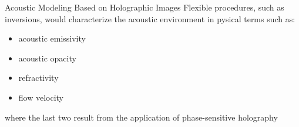 \documentclass{beamer}
\begin{document}

\begin{frame}{Acoustic Modeling Based on Holographic Images}
    Flexible procedures, such as inversions, would characterize the
    acoustic environment in pysical terms such as:
    \begin{itemize}
        \item acoustic emissivity
        \item acoustic opacity
        \item refractivity
        \item flow velocity
    \end{itemize}
    where the last two result from the application of phase-sensitive
    holography
\end{frame}

\end{document}
